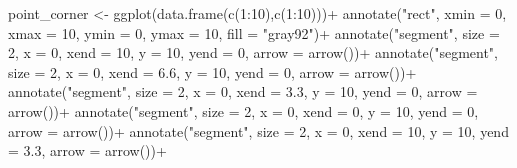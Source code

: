 \documentclass[
  letterpaper,
  DIV=11,
  numbers=noendperiod]{scrreprt}
\newenvironment{Shaded}{\begin{snugshade}}{\end{snugshade}}
\newcommand{\AttributeTok}[1]{\textcolor[rgb]{0.40,0.45,0.13}{#1}}
\newcommand{\DecValTok}[1]{\textcolor[rgb]{0.68,0.00,0.00}{#1}}
\newcommand{\FloatTok}[1]{\textcolor[rgb]{0.68,0.00,0.00}{#1}}
\newcommand{\FunctionTok}[1]{\textcolor[rgb]{0.28,0.35,0.67}{#1}}
\newcommand{\NormalTok}[1]{\textcolor[rgb]{0.00,0.23,0.31}{#1}}
\newcommand{\OtherTok}[1]{\textcolor[rgb]{0.00,0.23,0.31}{#1}}
\newcommand{\SpecialCharTok}[1]{\textcolor[rgb]{0.37,0.37,0.37}{#1}}
\newcommand{\StringTok}[1]{\textcolor[rgb]{0.13,0.47,0.30}{#1}}
\begin{document}
\begin{Shaded}
\begin{Highlighting}[]
\NormalTok{point\_corner }\OtherTok{\textless{}{-}} \FunctionTok{ggplot}\NormalTok{(}\FunctionTok{data.frame}\NormalTok{(}\FunctionTok{c}\NormalTok{(}\DecValTok{1}\SpecialCharTok{:}\DecValTok{10}\NormalTok{),}\FunctionTok{c}\NormalTok{(}\DecValTok{1}\SpecialCharTok{:}\DecValTok{10}\NormalTok{)))}\SpecialCharTok{+}
  \FunctionTok{annotate}\NormalTok{(}\StringTok{"rect"}\NormalTok{, }\AttributeTok{xmin =} \DecValTok{0}\NormalTok{, }\AttributeTok{xmax =} \DecValTok{10}\NormalTok{, }\AttributeTok{ymin =} \DecValTok{0}\NormalTok{, }\AttributeTok{ymax =} \DecValTok{10}\NormalTok{, }\AttributeTok{fill =} \StringTok{"gray92"}\NormalTok{)}\SpecialCharTok{+}
  \FunctionTok{annotate}\NormalTok{(}\StringTok{"segment"}\NormalTok{, }\AttributeTok{size =} \DecValTok{2}\NormalTok{, }\AttributeTok{x =} \DecValTok{0}\NormalTok{, }\AttributeTok{xend =} \DecValTok{10}\NormalTok{, }\AttributeTok{y =} \DecValTok{10}\NormalTok{, }\AttributeTok{yend =} \DecValTok{0}\NormalTok{, }\AttributeTok{arrow =} \FunctionTok{arrow}\NormalTok{())}\SpecialCharTok{+}
  \FunctionTok{annotate}\NormalTok{(}\StringTok{"segment"}\NormalTok{, }\AttributeTok{size =} \DecValTok{2}\NormalTok{, }\AttributeTok{x =} \DecValTok{0}\NormalTok{, }\AttributeTok{xend =} \FloatTok{6.6}\NormalTok{, }\AttributeTok{y =} \DecValTok{10}\NormalTok{, }\AttributeTok{yend =} \DecValTok{0}\NormalTok{, }\AttributeTok{arrow =} \FunctionTok{arrow}\NormalTok{())}\SpecialCharTok{+}
  \FunctionTok{annotate}\NormalTok{(}\StringTok{"segment"}\NormalTok{, }\AttributeTok{size =} \DecValTok{2}\NormalTok{, }\AttributeTok{x =} \DecValTok{0}\NormalTok{, }\AttributeTok{xend =} \FloatTok{3.3}\NormalTok{, }\AttributeTok{y =} \DecValTok{10}\NormalTok{, }\AttributeTok{yend =} \DecValTok{0}\NormalTok{, }\AttributeTok{arrow =} \FunctionTok{arrow}\NormalTok{())}\SpecialCharTok{+}
  \FunctionTok{annotate}\NormalTok{(}\StringTok{"segment"}\NormalTok{, }\AttributeTok{size =} \DecValTok{2}\NormalTok{, }\AttributeTok{x =} \DecValTok{0}\NormalTok{, }\AttributeTok{xend =} \DecValTok{0}\NormalTok{, }\AttributeTok{y =} \DecValTok{10}\NormalTok{, }\AttributeTok{yend =} \DecValTok{0}\NormalTok{, }\AttributeTok{arrow =} \FunctionTok{arrow}\NormalTok{())}\SpecialCharTok{+}
  \FunctionTok{annotate}\NormalTok{(}\StringTok{"segment"}\NormalTok{, }\AttributeTok{size =} \DecValTok{2}\NormalTok{, }\AttributeTok{x =} \DecValTok{0}\NormalTok{, }\AttributeTok{xend =} \DecValTok{10}\NormalTok{, }\AttributeTok{y =} \DecValTok{10}\NormalTok{, }\AttributeTok{yend =} \FloatTok{3.3}\NormalTok{, }\AttributeTok{arrow =} \FunctionTok{arrow}\NormalTok{())}\SpecialCharTok{+}

\end{Highlighting}
\end{Shaded}
\end{document}
